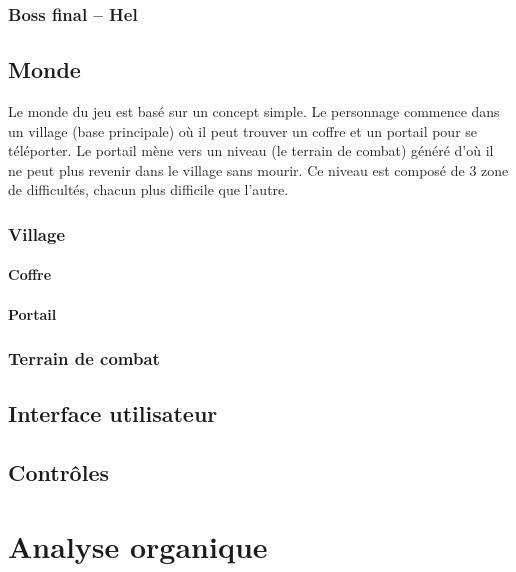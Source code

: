 \documentclass[11pt, a4paper, oneside]{report}
\begin{document}
\subsection{Boss final -- Hel}
\section{Monde}
Le monde du jeu est basé sur un concept simple. Le personnage commence dans un village (base principale) où il peut trouver un coffre et un portail pour se téléporter.
Le portail mène vers un niveau (le terrain de combat) généré d'où il ne peut plus revenir dans le village sans mourir. Ce niveau est composé de 3 zone de difficultés, chacun plus difficile que l'autre.
\subsection{Village}
\subsubsection{Coffre}
\subsubsection{Portail}
\subsection{Terrain de combat}
\section{Interface utilisateur}

\section{Contrôles}
\newpage
\chapter{Analyse organique}
\end{document}
